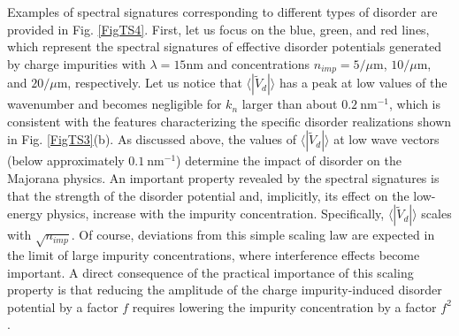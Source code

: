 \documentclass[aps,prmaterials,twocolumn,superscriptaddress,longbibliography]{revtex4-2}
\begin{document}
Examples of spectral signatures corresponding to different types of disorder are provided in Fig. \ref{FigTS4}. First, let us focus on the blue, green, and red lines, which represent the spectral signatures of effective disorder potentials generated by charge impurities with $\lambda=15$nm and concentrations $n_{imp}= 5/\mu$m, $10/\mu$m, and $20/\mu$m, respectively. Let us notice that $\langle|\widetilde{V}_d|\rangle$ has a peak at low values of the wavenumber and becomes negligible for $k_n$ larger than about $0.2~$nm$^{-1}$, which is consistent with the features characterizing the specific disorder realizations shown in Fig. \ref{FigTS3}(b). As discussed above, the values of $\langle|\widetilde{V}_d|\rangle$ at low wave vectors (below approximately $0.1~$nm$^{-1}$) determine the impact of disorder on the Majorana physics.
An important property revealed by the spectral signatures is that the strength of the disorder potential and, implicitly, its effect on the low-energy physics, increase with the impurity concentration. Specifically, $\langle|\widetilde{V}_d|\rangle$ scales with 
$\sqrt{n_{imp}}$. Of course, deviations from this simple scaling law are expected in the limit of large impurity concentrations, where interference effects become important. A direct consequence of the practical importance of this scaling property is that reducing the amplitude of the charge impurity-induced disorder potential by a factor $f$ requires lowering the impurity concentration by a factor $f^2$. 
\end{document}
